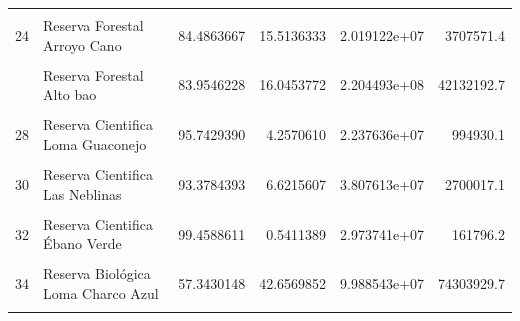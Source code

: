 \documentclass[10pt,landscape,a3paper]{article}
\begin{document}
\begin{longtable}[t]{llrrrr}
\cellcolor{lightgray}{23} & \cellcolor{lightgray}{Reserva Forestal Barrero} & \cellcolor{lightgray}{26.1405649} & \cellcolor{lightgray}{73.8594351} & \cellcolor{lightgray}{8.120355e+07} & \cellcolor{lightgray}{229438349.3}\\
24 & Reserva Forestal Arroyo Cano & 84.4863667 & 15.5136333 & 2.019122e+07 & 3707571.4\\
\cellcolor{lightgray}{25} & \cellcolor{lightgray}{Reserva Forestal Alto Mao} & \cellcolor{lightgray}{89.0366402} & \cellcolor{lightgray}{10.9633598} & \cellcolor{lightgray}{1.870790e+08} & \cellcolor{lightgray}{23035618.6}\\
\addlinespace
26 & Reserva Forestal Alto bao & 83.9546228 & 16.0453772 & 2.204493e+08 & 42132192.7\\
\cellcolor{lightgray}{27} & \cellcolor{lightgray}{Reserva Cientifica Loma Quita Espuela} & \cellcolor{lightgray}{92.7048217} & \cellcolor{lightgray}{7.2951783} & \cellcolor{lightgray}{7.021144e+07} & \cellcolor{lightgray}{5525116.5}\\
28 & Reserva Cientifica Loma Guaconejo & 95.7429390 & 4.2570610 & 2.237636e+07 & 994930.1\\
\cellcolor{lightgray}{29} & \cellcolor{lightgray}{Reserva Cientifica Loma Barbacoa} & \cellcolor{lightgray}{95.9849705} & \cellcolor{lightgray}{4.0150295} & \cellcolor{lightgray}{1.315749e+07} & \cellcolor{lightgray}{550374.7}\\
30 & Reserva Cientifica Las Neblinas & 93.3784393 & 6.6215607 & 3.807613e+07 & 2700017.1\\
\addlinespace
\cellcolor{lightgray}{31} & \cellcolor{lightgray}{Reserva Cientifica La Salcedoa} & \cellcolor{lightgray}{77.5760173} & \cellcolor{lightgray}{22.4239827} & \cellcolor{lightgray}{3.197405e+07} & \cellcolor{lightgray}{9242360.9}\\
32 & Reserva Cientifica Ébano Verde & 99.4588611 & 0.5411389 & 2.973741e+07 & 161796.2\\
\cellcolor{lightgray}{33} & \cellcolor{lightgray}{Reserva Biológica Sierra Prieta} & \cellcolor{lightgray}{96.8335788} & \cellcolor{lightgray}{3.1664212} & \cellcolor{lightgray}{3.873387e+06} & \cellcolor{lightgray}{126658.3}\\
34 & Reserva Biológica Loma Charco Azul & 57.3430148 & 42.6569852 & 9.988543e+07 & 74303929.7\\
\cellcolor{lightgray}{35} & \cellcolor{lightgray}{Refugio de Vida Silvestre Río Soco} & \cellcolor{lightgray}{45.1802336} & \cellcolor{lightgray}{54.8197664} & \cellcolor{lightgray}{5.315016e+06} & \cellcolor{lightgray}{6449013.7}\\

\end{longtable}
\end{document}
